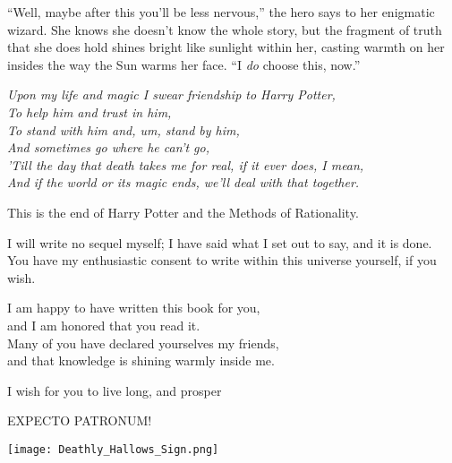 “Well, maybe after this you’ll be less nervous,” the hero says to her enigmatic wizard. She knows she doesn’t know the whole story, but the fragment of truth that she does hold shines bright like sunlight within her, casting warmth on her insides the way the Sun warms her face. “I \emph{do} choose this, now.”

\noindent{}\emph{Upon my life and magic I swear friendship to Harry Potter,}\\
\emph{To help him and trust in him,}\\
\emph{To stand with him and, um, stand by him,}\\
\emph{And sometimes go where he can’t go,}\\
\emph{’Till the day that death takes me for real, if it ever does, I mean,}\\
\emph{And if the world or its magic ends, we’ll deal with that together.}

\newpage
\begin{chapterOpeningAuthorNote}
This is the end of Harry Potter and the Methods of Rationality.

I will write no sequel myself; I have said what I set out to say, and it is done.\\
You have my enthusiastic consent to write within this universe yourself, if you wish.




I am happy to have written this book for you,\\
and I am honored that you read it.\\
Many of you have declared yourselves my friends,\\
and that knowledge is shining warmly inside me.

I wish for you to live long, and prosper
\end{chapterOpeningAuthorNote}
\begin{chapterOpeningQuote}
EXPECTO PATRONUM!
\end{chapterOpeningQuote}

\vspace*{\fill}
{
\begin{center}
\texttt{[image: Deathly\_Hallows\_Sign.png]}
\end{center}
}
\vspace*{\fill}
\clearpage

